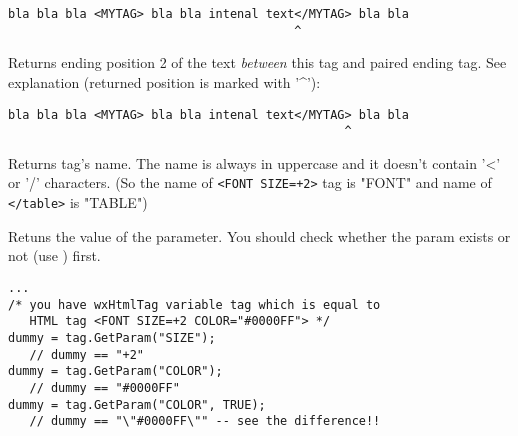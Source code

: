 \begin{verbatim}
bla bla bla <MYTAG> bla bla intenal text</MYTAG> bla bla
                                        ^
\end{verbatim}

\label{wxhtmltaggetendpos2}


Returns ending position 2 of the text {\it between} this tag and paired
ending tag.
See explanation (returned position is marked with '^'):

\begin{verbatim}
bla bla bla <MYTAG> bla bla intenal text</MYTAG> bla bla
                                               ^
\end{verbatim}

\label{wxhtmltaggetname}


Returns tag's name. The name is always in uppercase and it doesn't contain
'<' or '/' characters. (So the name of {\tt <FONT SIZE=+2>} tag is "FONT"
and name of {\tt </table>} is "TABLE")

\label{wxhtmltaggetparam}


Retuns the value of the parameter. You should check whether the
param exists or not (use ) first.





\begin{verbatim}
...
/* you have wxHtmlTag variable tag which is equal to
   HTML tag <FONT SIZE=+2 COLOR="#0000FF"> */
dummy = tag.GetParam("SIZE");
   // dummy == "+2"
dummy = tag.GetParam("COLOR");
   // dummy == "#0000FF"
dummy = tag.GetParam("COLOR", TRUE);
   // dummy == "\"#0000FF\"" -- see the difference!!
\end{verbatim}

\label{wxhtmltaghasending}


